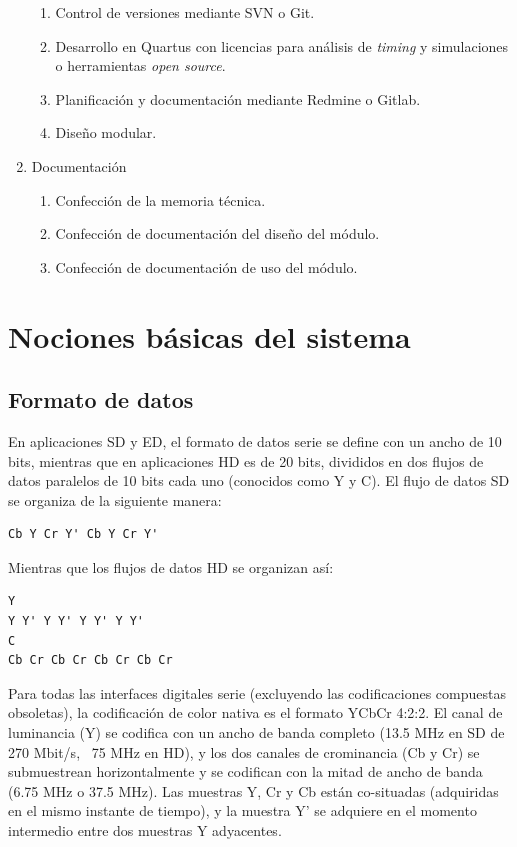 \begin{enumerate}
\begin{enumerate}
        \item Control de versiones mediante SVN o Git.
        \item Desarrollo en Quartus con licencias para análisis de \textit{timing} y simulaciones o herramientas \textit{open source}.
        \item Planificación y documentación mediante Redmine o Gitlab.
        \item Diseño modular.
    \end{enumerate}
    \item Documentación
    \begin{enumerate}
        \item Confección de la memoria técnica.
        \item Confección de documentación del diseño del módulo.
        \item Confección de documentación de uso del módulo.
    \end{enumerate}
\end{enumerate}

\section{Nociones básicas del sistema}

\subsection{Formato de datos}

En aplicaciones SD y ED, el formato de datos serie se define con un ancho de 10 bits,
mientras que en aplicaciones HD es de 20 bits, divididos en dos flujos de datos paralelos
de 10 bits cada uno (conocidos como Y y C). El flujo de datos SD se organiza de la
siguiente manera:

\begin{verbatim}
Cb Y Cr Y' Cb Y Cr Y'
\end{verbatim}

Mientras que los flujos de datos HD se organizan así:

\begin{verbatim}
Y
Y Y' Y Y' Y Y' Y Y'
C
Cb Cr Cb Cr Cb Cr Cb Cr
\end{verbatim}

Para todas las interfaces digitales serie (excluyendo las codificaciones compuestas
obsoletas), la codificación de color nativa es el formato YCbCr 4:2:2. El canal de
luminancia (Y) se codifica con un ancho de banda completo (13.5 MHz en SD de 270 Mbit/s,
~75 MHz en HD), y los dos canales de crominancia (Cb y Cr) se submuestrean horizontalmente
y se codifican con la mitad de ancho de banda (6.75 MHz o 37.5 MHz). Las muestras Y, Cr y
Cb están co-situadas (adquiridas en el mismo instante de tiempo), y la muestra Y' se
adquiere en el momento intermedio entre dos muestras Y adyacentes.

